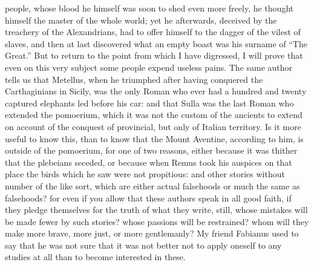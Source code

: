 \documentclass[12pt]{article}
\begin{document}
people, whose blood he himself was soon to shed even more freely, he thought himself the master of the whole world; yet he afterwards, deceived by the treachery of the Alexandrians, had to offer himself to the dagger of the vilest of slaves, and then at last discovered what an empty boast was his surname of “The Great.” But to return to the point from which I have digressed, I will prove that even on this very subject some people expend useless pains. The same author tells us that Metellus, when he triumphed after having conquered the Carthaginians in Sicily, was the only Roman who ever had a hundred and twenty captured elephants led before his car: and that Sulla was the last Roman who extended the pomoerium, which it was not the custom of the ancients to extend on account of the conquest of provincial, but only of Italian territory. Is it more useful to know this, than to know that the Mount Aventine, according to him, is outside of the pomoerium, for one of two reasons, either because it was thither that the plebeians seceded, or because when Remus took his auspices on that place the birds which he saw were not propitious: and other stories without number of the like sort, which are either actual falsehoods or much the same as falsehoods? for even if you allow that these authors speak in all good faith, if they pledge themselves for the truth of what they write, still, whose mistakes will be made fewer by such stories? whose passions will be restrained? whom will they make more brave, more just, or more gentlemanly? My friend Fabianus used to say that he was not sure that it was not better not to apply oneself to any studies at all than to become interested in these.
\end{document}
